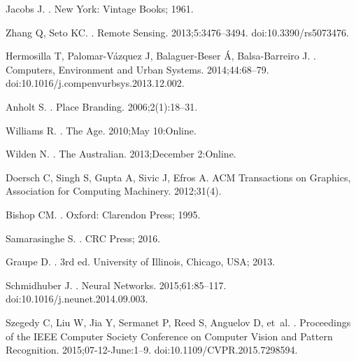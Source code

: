 Jacobs J.
.
\newblock New York: Vintage Books; 1961.

Zhang Q, Seto KC.
.
\newblock Remote Sensing. 2013;5:3476--3494.
\newblock doi:{10.3390/rs5073476}.

Hermosilla T, Palomar-V{\'{a}}zquez J, Balaguer-Beser {\'{A}}, Balsa-Barreiro
  J.
.
\newblock Computers, Environment and Urban Systems. 2014;44:68--79.
\newblock doi:{10.1016/j.compenvurbsys.2013.12.002}.

Anholt S.
.
\newblock Place Branding. 2006;2(1):18--31.

Williams R.
.
\newblock The Age. 2010;May 10:Online.

Wilden N.
.
\newblock The Australian. 2013;December 2:Online.

Doersch C, Singh S, Gupta A, Sivic J, Efros A.
\newblock ACM Transactions on Graphics, Association for Computing Machinery.
  2012;31(4).



Bishop CM.
.
\newblock Oxford: Clarendon Press; 1995.

Samarasinghe S.
.
\newblock CRC Press; 2016.

Graupe D.
.
\newblock 3rd ed. University of Illinois, Chicago, USA; 2013.

Schmidhuber J.
.
\newblock Neural Networks. 2015;61:85--117.
\newblock doi:{10.1016/j.neunet.2014.09.003}.

Szegedy C, Liu W, Jia Y, Sermanet P, Reed S, Anguelov D, et~al.
.
\newblock Proceedings of the IEEE Computer Society Conference on Computer
  Vision and Pattern Recognition. 2015;07-12-June:1--9.
\newblock doi:{10.1109/CVPR.2015.7298594}.

